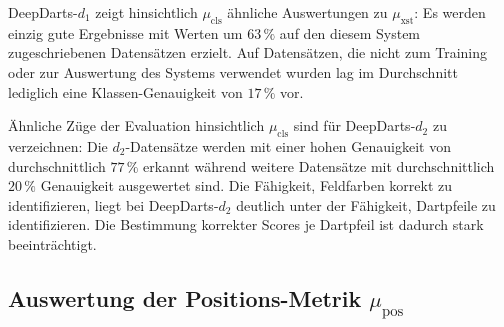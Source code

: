 DeepDarts-$d_1$ zeigt hinsichtlich $\mu_\text{cls}$ ähnliche Auswertungen zu $\mu_\text{xst}$: Es werden einzig gute Ergebnisse mit Werten um $63\,\%$ auf den diesem System zugeschriebenen Datensätzen erzielt. Auf Datensätzen, die nicht zum Training oder zur Auswertung des Systems verwendet wurden lag im Durchschnitt lediglich eine Klassen-Genauigkeit von $17\,\%$ vor.

Ähnliche Züge der Evaluation hinsichtlich $\mu_\text{cls}$ sind für DeepDarts-$d_2$ zu verzeichnen: Die $d_2$-Datensätze werden mit einer hohen Genauigkeit von durchschnittlich $77\,\%$ erkannt während weitere Datensätze mit durchschnittlich $20\,\%$ Genauigkeit ausgewertet sind. Die Fähigkeit, Feldfarben korrekt zu identifizieren, liegt bei DeepDarts-$d_2$ deutlich unter der Fähigkeit, Dartpfeile zu identifizieren. Die Bestimmung korrekter Scores je Dartpfeil ist dadurch stark beeinträchtigt.


\subsection{Auswertung der Positions-Metrik \texorpdfstring{$\mu_\text{pos}$}{µ\_pos}}
\label{sec:auswertung_pos}

\NNPos


